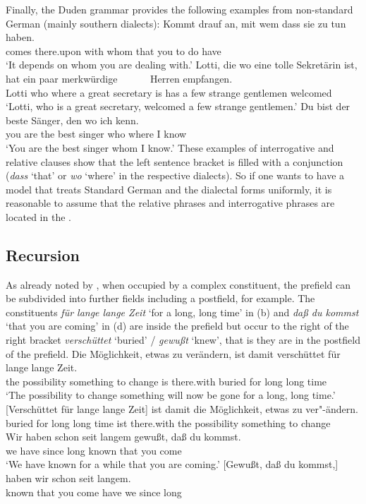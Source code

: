 Finally, the Duden grammar \citep[§1347]{Duden2005-Authors} provides the following examples from non-standard German
(mainly southern dialects):
\eal
\ex 
\gll Kommt drauf an, mit wem dass sie zu tun haben.\\
     comes there.upon \partic{} with whom that you to do have\\
\glt `It depends on whom you are dealing with.'
\zl
\eal
\ex 
\gll Lotti, die wo eine tolle Sekretärin ist, hat ein paar merkwürdige~~~~~~ Herren empfangen.\\
     Lotti  who where a great secretary is has a few strange gentlemen welcomed\\
\glt `Lotti, who is a great secretary, welcomed a few strange gentlemen.'
\ex 
\gll Du bist der beste Sänger, den wo ich kenn.\\
     you are the best singer   who where I know\\
\glt `You are the best singer whom I know.'
\zl
These examples of interrogative and relative clauses show that the left sentence bracket is filled
with a conjunction (\emph{dass} `that' or \emph{wo} `where' in the respective dialects). So if one wants to have a model that treats Standard German and the
dialectal forms uniformly, it is reasonable to assume that the relative phrases and interrogative phrases
are located in the \vf. 

\subsection{Recursion}
\label{sec-topo-rekursion}

As already noted by \citet[]{Reis80a}, when occupied by a complex constituent, the prefield can be subdivided into 
further fields including a postfield, for example. The constituents \emph{für lange lange Zeit} `for a long, long
time' in (b) and  \emph{daß du kommst} `that you are coming' in (d) are inside the prefield but occur
to the right of the right bracket \emph{verschüttet} `buried' / \emph{gewußt} `knew', that is they are in the postfield
of the prefield.
\eal
\label{Beispiel-topologisch-komplexes-Vorfeld}
\ex
\gll Die Möglichkeit, etwas zu verändern, ist damit verschüttet für lange lange Zeit.\\
	 the possibility something to change is there.with buried for long long time\\
\glt `The possibility to change something will now be gone for a long, long time.'	  
\ex 
\gll {}[Verschüttet für lange lange Zeit] ist damit die Möglichkeit,      etwas zu ver"-ändern.\\
      \spacebr{}buried for long long time ist there.with the possibility  something to change\\
\ex 
\gll Wir haben schon seit langem gewußt, daß du kommst.\\
     we have \particle{} since long known that you come\\
\glt `We have known for a while that you are coming.'
\ex 
\gll {}[Gewußt, daß du kommst,] haben wir schon seit langem.\\
	 \spacebr{}known that you come have we \particle{} since long\\
\zl


